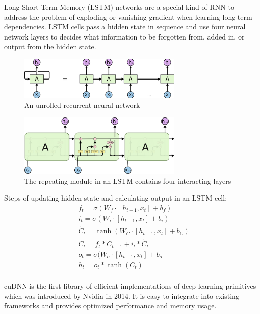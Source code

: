 \documentclass{article}
\begin{document}
Long Short Term Memory (LSTM)\cite{hochreiter1997long} networks are a special kind of RNN to address the problem of exploding or vanishing gradient when learning long-term dependencies. LSTM cells pass a hidden state in sequence and use four neural network layers to decides what information to be forgotten from, added in, or output from the hidden state.

\begin{figure}[h]
\centering
\includegraphics[width=0.7\textwidth]{rnn}
\caption{An unrolled recurrent neural network\cite{understandLSTM}}
\end{figure}

\begin{figure}[h]
\centering
\includegraphics[width=0.7\textwidth]{lstm}
\caption{The repeating module in an LSTM contains four interacting layers\cite{understandLSTM}}
\end{figure}

Steps of updating hidden state and calculating output in an LSTM cell:
\begin{equation}
  \begin{split}
    & f_t=\sigma(W_f\cdot [h_{t-1},x_t]+b_f) \\
    & i_t=\sigma(W_i\cdot [h_{t-1},x_t]+b_i) \\
    & \widetilde{C}_t=\tanh(W_C\cdot [h_{t-1},x_t]+b_C) \\
    & C_t=f_t * C_{t-1}+i_t * \widetilde{C}_t \\
    & o_t=\sigma(W_o\cdot [h_{t-1},x_t]+b_o \\
    & h_t=o_t * \tanh(C_t) \\
  \end{split}
\end{equation}


cuDNN\cite{chetlur2014cudnn} is the first library of efficient implementations of deep learning primitives which was introduced by Nvidia in 2014. It is easy to integrate into existing frameworks and provides optimized performance and memory usage.
\end{document}
